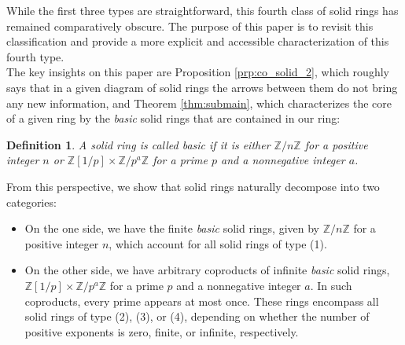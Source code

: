 \documentclass{amsart}
\newcommand\TODO[1]{\textcolor{red}{Pendiente: #1}}
\newtheorem{definition}[subsection]{Definition}
\newcommand{\Z}{{\mathbb Z}}
\begin{document}
    While the first three types are straightforward, this fourth class of solid rings has remained comparatively obscure.
    The purpose of this paper is to revisit this classification and provide a more explicit and accessible characterization of this fourth type.\\



    
    The key insights on this paper are Proposition \ref{prp:co_solid_2}, which roughly says that in a given diagram of solid rings the arrows between them do not bring any new information, and Theorem \ref{thm:submain}, which characterizes the core of a given ring by the \emph{basic} solid rings that are contained in our ring:
    
    \begin{definition}
        A solid ring is called \emph{basic} if it is either $\Z/n\Z$ for a positive integer $n$ or $\Z[1/p] \times \Z/p^a\Z$ for a prime $p$ and a nonnegative integer $a$.
    \end{definition}
    
    From this perspective, we show that solid rings naturally decompose into two categories:
    \begin{itemize}
        \item On the one side, we have the finite \emph{basic} solid rings, given by $\Z/n\Z$ for a positive integer $n$, which account for all solid rings of type (1).
    
        \item On the other side, we have arbitrary coproducts of infinite \emph{basic} solid rings, $\Z[1/p] \times \Z/p^a\Z$ for a prime $p$ and a nonnegative integer $a$.
        In such coproducts, every prime appears at most once.
        These rings encompass all solid rings of type (2), (3), or (4), depending on whether the number of positive exponents is zero, finite, or infinite, respectively.
    \end{itemize}
\end{document}
